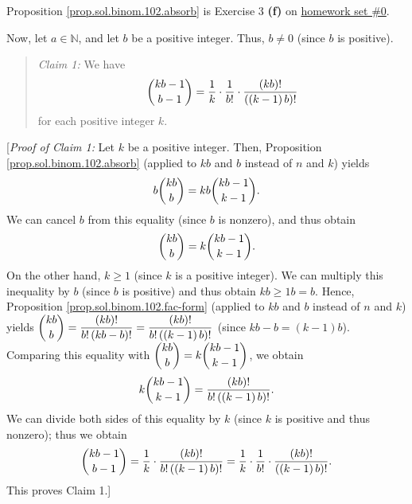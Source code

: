 \documentclass[paper=a4, fontsize=12pt]{scrartcl}%
\theoremstyle{plainsl}
\theoremstyle{definition}
\theoremstyle{remark}
\newenvironment{statement}{\begin{quote}}{\end{quote}}
\begin{document}
Proposition \ref{prop.sol.binom.102.absorb} is Exercise 3 \textbf{(f)} on
\href{http://www-users.math.umn.edu/~dgrinber/19s/hw0s.pdf}{homework set \#0}.

Now, let $a\in\mathbb{N}$, and let $b$ be a positive integer. Thus, $b\neq0$
(since $b$ is positive).

\begin{statement}
\textit{Claim 1:} We have
\[
\dbinom{kb-1}{b-1}=\dfrac{1}{k}\cdot\dfrac{1}{b!}\cdot\dfrac{\left(
kb\right)  !}{\left(  \left(  k-1\right)  b\right)  !}%
\]
for each positive integer $k$.
\end{statement}

[\textit{Proof of Claim 1:} Let $k$ be a positive integer. Then, Proposition
\ref{prop.sol.binom.102.absorb} (applied to $kb$ and $b$ instead of $n$ and
$k$) yields%
\[
b\dbinom{kb}{b}=kb\dbinom{kb-1}{k-1}.
\]
We can cancel $b$ from this equality (since $b$ is nonzero), and thus obtain%
\[
\dbinom{kb}{b}=k\dbinom{kb-1}{k-1}.
\]
On the other hand, $k\geq1$ (since $k$ is a positive integer). We can multiply
this inequality by $b$ (since $b$ is positive) and thus obtain $kb\geq1b=b$.
Hence, Proposition \ref{prop.sol.binom.102.fac-form} (applied to $kb$ and $b$
instead of $n$ and $k$) yields $\dbinom{kb}{b}=\dfrac{\left(  kb\right)
!}{b!\left(  kb-b\right)  !}=\dfrac{\left(  kb\right)  !}{b!\left(  \left(
k-1\right)  b\right)  !}$ (since $kb-b=\left(  k-1\right)  b$). Comparing this
equality with $\dbinom{kb}{b}=k\dbinom{kb-1}{k-1}$, we obtain%
\[
k\dbinom{kb-1}{k-1}=\dfrac{\left(  kb\right)  !}{b!\left(  \left(  k-1\right)
b\right)  !}.
\]
We can divide both sides of this equality by $k$ (since $k$ is positive and
thus nonzero); thus we obtain%
\[
\dbinom{kb-1}{b-1}=\dfrac{1}{k}\cdot\dfrac{\left(  kb\right)  !}{b!\left(
\left(  k-1\right)  b\right)  !}=\dfrac{1}{k}\cdot\dfrac{1}{b!}\cdot
\dfrac{\left(  kb\right)  !}{\left(  \left(  k-1\right)  b\right)  !}.
\]
This proves Claim 1.]
\end{document}
